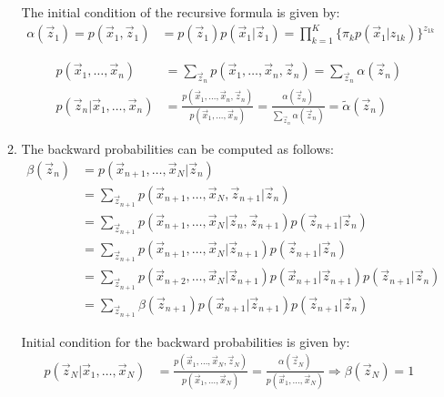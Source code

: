 \documentclass[12pt,twoside]{article}
\begin{document}
\begin{enumerate}
\begin{enumerate}
		The initial condition of the recursive formula is given by:
		\begin{align*}
			\alpha(\vec{z}_1) =p(\vec{x}_1,\vec{z}_1) &= p(\vec{z}_1)p(\vec{x}_1 \vert \vec{z}_1)=\prod_{k=1}^K \lbrace \pi_k p(\vec{x}_1\vert z_{1k})\rbrace^{z_{1k}}
		\end{align*}

		\begin{align*}
			p(\vec{x}_1,\ldots, \vec{x}_n)&= \sum_{\vec{z}_n}p(\vec{x}_1, \ldots, \vec{x}_n, \vec{z}_n) = \sum_{\vec{z}_n} \alpha(\vec{z}_n)\\
			p(\vec{z}_n\vert \vec{x}_1,\ldots, \vec{x}_n) & = \frac{p(\vec{x}_1,\ldots, \vec{x}_n, \vec{z}_n)}{p(\vec{x}_1,\ldots, \vec{x}_n)}=\frac{\alpha(\vec{z}_n)}{\sum_{\vec{z}_n} 			\alpha(\vec{z}_n)}=\tilde{\alpha}(\vec{z}_n)
		\end{align*}

	\item The backward probabilities can be computed as follows:
		\begin{align*}
			\beta(\vec{z}_n)
			&= p(\vec{x}_{n+1},\ldots, \vec{x}_N \vert \vec{z}_n)\\
			& = \sum_{\vec{z}_{n+1}}p(\vec{x}_{n+1},\ldots, \vec{x}_N, \vec{z}_{n+1} \vert \vec{z}_n)\\
			& = \sum_{\vec{z}_{n+1}}p(\vec{x}_{n+1},\ldots, \vec{x}_N \vert \vec{z}_n,\vec{z}_{n+1} ) p(\vec{z}_{n+1}\vert \vec{z}_{n})\\
			& = \sum_{\vec{z}_{n+1}}p(\vec{x}_{n+1},\ldots, \vec{x}_N \vert \vec{z}_{n+1} ) p(\vec{z}_{n+1}\vert \vec{z}_{n})\\
			& = \sum_{\vec{z}_{n+1}}p(\vec{x}_{n+2},\ldots, \vec{x}_N \vert \vec{z}_{n+1} ) p(\vec{x}_{n+1}\vert \vec{z}_{n+1}) p(\vec{z}_{n+1} \vert \vec{z}_{n})\\
			& = \sum_{\vec{z}_{n+1}} \beta(\vec{z}_{n+1})p(\vec{x}_{n+1}\vert \vec{z}_{n+1}) p(\vec{z}_{n+1} \vert \vec{z}_{n})
		\end{align*}

		Initial condition for the backward probabilities is given by:
		\begin{align*}
			p(\vec{z}_N \vert \vec{x}_1,\ldots,\vec{x}_N) & = \frac{p( \vec{x}_1,\ldots,\vec{x}_N, \vec{z}_N)}{p(\vec{x}_1,\ldots,\vec{x}_N)}=\frac{\alpha(\vec{z}_N)}{p(\vec{x}_1,\ldots,\vec{x}_N)}\Rightarrow \beta(\vec{z}_N) = 1
		\end{align*}

	\end{enumerate}



\end{enumerate}
\end{document}
